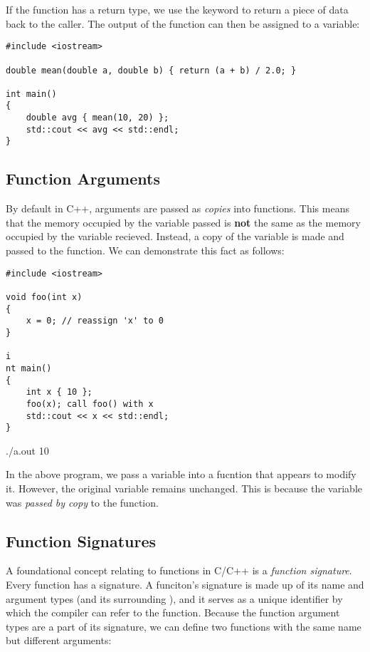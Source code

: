 \noindent
If the function has a return type, we use the  keyword to return a piece of data back to the caller. The output of the function can then be assigned to a variable:

\begin{lstlisting}[style=cxx]
#include <iostream>

double mean(double a, double b) { return (a + b) / 2.0; }

int main()
{
    double avg { mean(10, 20) };
    std::cout << avg << std::endl;
}
\end{lstlisting}

\subsection{Function Arguments}

\noindent
By default in C++, arguments are passed as \textit{copies} into functions.
This means that the memory occupied by the variable passed is \textbf{not} the same as the memory occupied by the variable recieved.
Instead, a copy of the variable is made and passed to the function.
We can demonstrate this fact as follows:

\begin{lstlisting}[style=cxx]
#include <iostream>

void foo(int x)
{
    x = 0; // reassign 'x' to 0
}

i
nt main()
{
    int x { 10 };
    foo(x); call foo() with x
    std::cout << x << std::endl;
}
\end{lstlisting}

\begin{terminal}
./a.out
10
\end{terminal}

\noindent
In the above program, we pass a variable into a fucntion that appears to modify it.
However, the original variable remains unchanged.
This is because the variable was \textit{passed by copy} to the function.

\subsection{Function Signatures}

\noindent
A foundational concept relating to functions in C/C++ is a \textit{function signature}.
Every function has a signature.
A funciton's signature is made up of its name and argument types (and its surrounding ), and it serves as a unique identifier by which the compiler can refer to the function.
Because the function argument types are a part of its signature, we can define two functions with the same name but different arguments:

